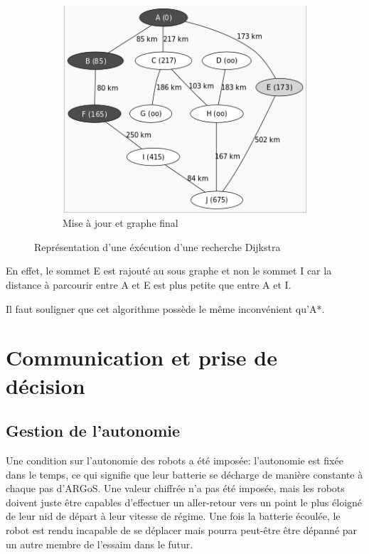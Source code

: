 \documentclass[a4paper]{report}
\begin{document}
\begin{figure}[h!]
        \begin{subfigure}[h!]{0.4\textwidth}
                \includegraphics[width=\textwidth]{dijk3.png}
                \caption{Mise à jour et graphe final}
        \end{subfigure}
        \caption{Représentation d'une éxécution d'une recherche Dijkstra\label{fig:dijkstra}\cite{wikiDijkstra}}
\end{figure}


En effet, le sommet E est rajouté au sous graphe et non le sommet I car la distance à parcourir entre A et E est plus petite que entre A et I.

Il faut souligner que cet algorithme possède le même inconvénient qu'A*. 

\chapter{Communication et prise de décision}

\section{Gestion de l'autonomie}
Une condition sur l'autonomie des robots a été imposée: l'autonomie est fixée dans le temps, ce qui signifie que leur batterie se décharge de manière constante à chaque pas d'ARGoS. Une valeur chiffrée n'a pas été imposée, mais les robots doivent juste être capables d'effectuer un aller-retour vers un point le plus éloigné de leur nid de départ à leur vitesse de régime. Une fois la batterie écoulée, le robot est rendu incapable de se déplacer mais pourra peut-être être dépanné par un autre membre de l'essaim dans le futur.
\end{document}
